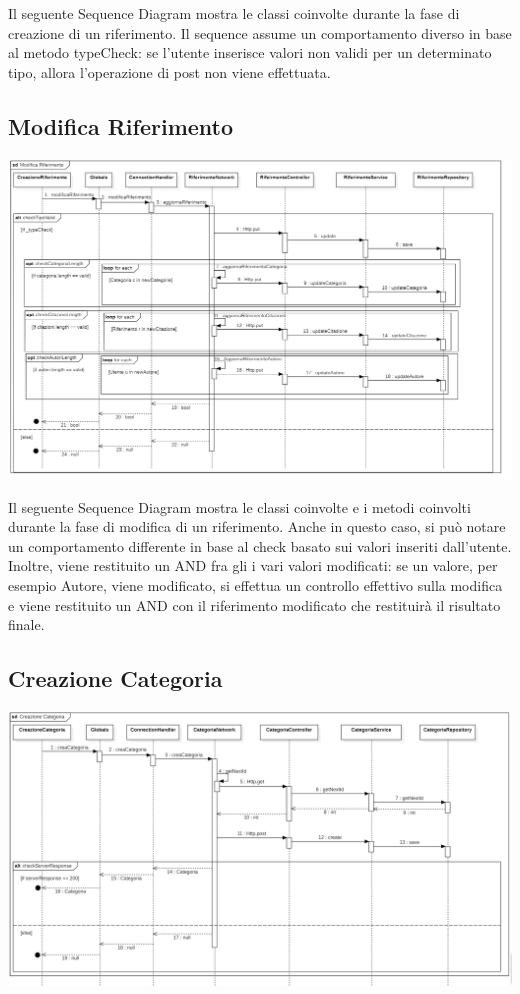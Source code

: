 {\begin{center}
        \end{center}
Il seguente Sequence Diagram mostra le classi coinvolte durante la fase di creazione di un riferimento. Il sequence assume un comportamento diverso in base al metodo typeCheck: se l'utente inserisce valori non validi per un determinato tipo, allora l'operazione di post non viene effettuata. 
\raggedright{\subsection{Modifica Riferimento}}
        \begin{center}
            \includegraphics[width=1.0\textwidth]{Immagini/Alexandria/SequenceDesignModifica.PNG} 
        \end{center}
Il seguente Sequence Diagram mostra le classi coinvolte e i metodi coinvolti durante la fase di modifica di un riferimento. Anche in questo caso, si può notare un comportamento differente in base al check basato sui valori inseriti dall'utente. Inoltre, viene restituito un AND fra gli i vari valori modificati: se un valore, per esempio Autore, viene modificato, si effettua un controllo effettivo sulla modifica e viene restituito un AND con il riferimento modificato che restituirà il risultato finale.
\raggedright{\subsection{Creazione Categoria}}
        \begin{center}
            \includegraphics[width=1.0\textwidth]{Immagini/Alexandria/SequenceDesignCategoria.PNG} 

\end{center}}
